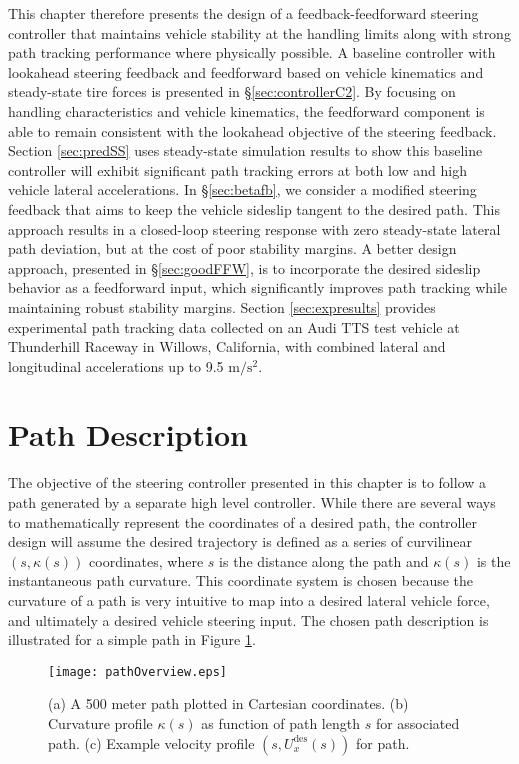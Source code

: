 This chapter therefore presents the design of a feedback-feedforward steering controller that maintains vehicle stability at the handling limits
along with strong path tracking performance where physically possible. 
 A baseline controller with lookahead steering feedback and feedforward based on vehicle kinematics and steady-state tire forces
 is presented in \S \ref{sec:controllerC2}. By focusing on handling characteristics and vehicle kinematics, the feedforward component is able to
remain consistent with the lookahead objective of the steering feedback.  
Section \ref{sec:predSS} uses steady-state simulation results to show this baseline controller will exhibit 
significant path tracking errors at both low and high vehicle lateral accelerations. 
 In \S \ref{sec:betafb}, we consider a modified steering feedback that aims to keep the vehicle sideslip tangent to the desired path. This approach results
 in a closed-loop steering
response with zero steady-state lateral path deviation, but at the cost of poor stability margins. A better
 design approach, presented in \S \ref{sec:goodFFW}, 
is to incorporate the desired sideslip behavior
as a feedforward input, which significantly improves path tracking while maintaining robust stability margins. 
Section \ref{sec:expresults}  provides experimental path tracking data collected
on an Audi TTS test vehicle at Thunderhill Raceway in Willows, California, with
 combined lateral and longitudinal accelerations up to 9.5 $\mathrm{m/s^2}$. 

 \section{Path Description}
 
The objective of the steering controller presented in this chapter is to follow a path generated by a separate high 
level controller. While there are several ways to mathematically represent the coordinates of a desired path, the controller
design will assume the desired trajectory is defined as a series of curvilinear $\left(s, \kappa(s)\right)$ coordinates, where 
$s$ is the distance along the path and $\kappa(s)$ is the instantaneous path curvature. This coordinate system is chosen
because the curvature of a path is very intuitive to map into a desired lateral vehicle force, and ultimately a desired
vehicle steering input. The chosen path description is illustrated
for a simple path in Figure \ref{fig:pathFig}. 

 \begin{figure}[h]
\centering
\texttt{[image: pathOverview.eps]}
\caption[Path coordinate system]{(a) A 500 meter path plotted in Cartesian coordinates. (b) Curvature profile $\kappa(s)$ as function of 
path length $s$ for associated path. (c) Example velocity profile $(s, U_x^\mathrm{des}(s))$ for path.}
\label{fig:pathFig}
\end{figure}


